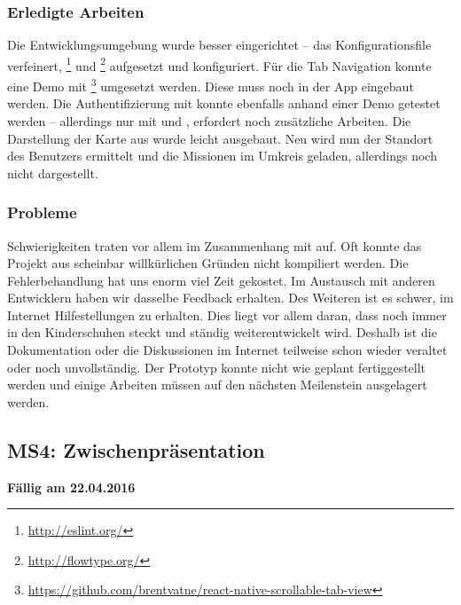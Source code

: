\subsubsection{Erledigte Arbeiten}
Die Entwicklungsumgebung wurde besser eingerichtet – das  Konfigurationsfile verfeinert, \footnote{\url{http://eslint.org/}} und \footnote{\url{http://flowtype.org/}} aufgesetzt und konfiguriert.\newline
Für die Tab Navigation konnte eine Demo mit \footnote{\url{https://github.com/brentvatne/react-native-scrollable-tab-view}} umgesetzt werden. Diese muss noch in der \kort{} App eingebaut werden.\newline
Die Authentifizierung mit  konnte ebenfalls anhand einer Demo getestet werden – allerdings nur mit  und ,  erfordert noch zusätzliche Arbeiten.\newline
Die Darstellung der Karte aus  wurde leicht ausgebaut. Neu wird nun der Standort des Benutzers ermittelt und die Missionen im Umkreis geladen, allerdings noch nicht dargestellt.

\subsubsection{Probleme}
Schwierigkeiten traten vor allem im Zusammenhang mit  auf.
Oft konnte das Projekt aus scheinbar willkürlichen Gründen nicht kompiliert werden.
Die Fehlerbehandlung hat uns enorm viel Zeit gekostet.
Im Austausch mit anderen  Entwicklern haben wir dasselbe Feedback erhalten.\newline
Des Weiteren ist es schwer, im Internet Hilfestellungen zu erhalten.
Dies liegt vor allem daran, dass  noch immer in den Kinderschuhen steckt und ständig weiterentwickelt wird.
Deshalb ist die Dokumentation oder die Diskussionen im Internet teilweise schon wieder veraltet oder noch unvollständig.\newline
Der Prototyp konnte nicht wie geplant fertiggestellt werden und einige Arbeiten müssen auf den nächsten Meilenstein ausgelagert werden.

\subsection{MS4: Zwischenpräsentation}
\label{pm-ms4}
\textbf{Fällig am 22.04.2016}
